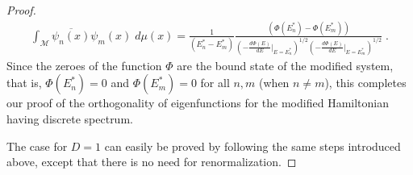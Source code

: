 \documentclass[10pt,a4paper]{amsart}
\begin{document}
\begin{proof}
%
\begin{eqnarray} \int_{\mathcal M} \overline{\psi_n(x)} \psi_m (x) \; d\mu( x) = \frac{1}{\left(E_{n}^* - E_{m}^* \right)} \frac{\left(\Phi(E_{n}^{*}) - \Phi(E_{m}^*)\right)}{\left(-\frac{d\Phi(E)}{d E}\bigg|_{E=E_{n}^{*}}\right)^{1/2} \left(-\frac{d \Phi(E)}{d E}\bigg|_{E=E_{m}^{*}}\right)^{1/2}} \;.
\end{eqnarray}
%
Since the zeroes of the function $\Phi$ are the bound state of the modified system, that is, $\Phi(E_{n}^{*})=0$ and $\Phi(E_{m}^{*})=0$ for all $n, m$ (when $n\neq m$), this completes our proof of the orthogonality of eigenfunctions for the modified  Hamiltonian having discrete spectrum.   


The case for $D=1$ can easily be proved by following the same steps introduced above, except that there is no need for renormalization. 
\end{proof}
\end{document}
